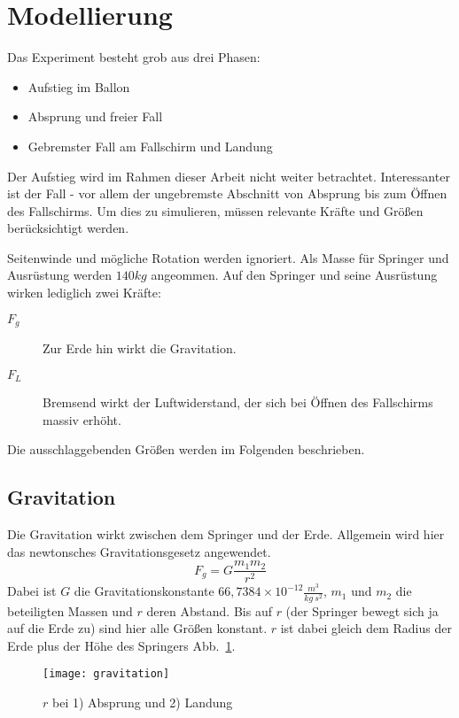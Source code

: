 \section{Modellierung}

Das Experiment besteht grob aus drei Phasen:
\begin{itemize}
  \item Aufstieg im Ballon
  \item Absprung und freier Fall
  \item Gebremster Fall am Fallschirm und Landung
\end{itemize}
Der Aufstieg wird im Rahmen dieser Arbeit nicht weiter betrachtet.
Interessanter ist der Fall - vor allem der ungebremste Abschnitt von Absprung bis zum Öffnen des Fallschirms.
Um dies zu simulieren, müssen relevante Kräfte und Größen berücksichtigt werden. %

Seitenwinde und mögliche Rotation werden ignoriert.
Als Masse für Springer und Ausrüstung werden $140kg$ angeommen.
Auf den Springer und seine Ausrüstung wirken lediglich zwei Kräfte:
\begin{description}
  \item[$F_g$] Zur Erde hin wirkt die Gravitation.
  \item[$F_L$] Bremsend wirkt der Luftwiderstand, der sich bei Öffnen des Fallschirms massiv erhöht.
\end{description}

Die ausschlaggebenden Größen werden im Folgenden beschrieben.

\subsection{Gravitation}
Die Gravitation wirkt zwischen dem Springer und der Erde.
Allgemein wird hier das newtonsches Gravitationsgesetz angewendet.
\begin{equation}
F_g=G \frac{m_1 m_2}{r^2}
\end{equation}
Dabei ist $G$ die Gravitationskonstante $66,7384\times 10^{-12} \frac{m^3}{kg\ s^2}$, $m_1$ und $m_2$ die beteiligten Massen und $r$ deren Abstand.
Bis auf $r$ (der Springer bewegt sich ja auf die Erde zu) sind hier alle Größen konstant.
$r$ ist dabei gleich dem Radius der Erde plus der Höhe des Springers \vgl Abb.~\ref{fig:gravitation}.
\begin{figure}[h]
  \centering
  \texttt{[image: gravitation]}
  \caption{$r$ bei 1) Absprung und 2) Landung}
  \label{fig:gravitation}
\end{figure}

